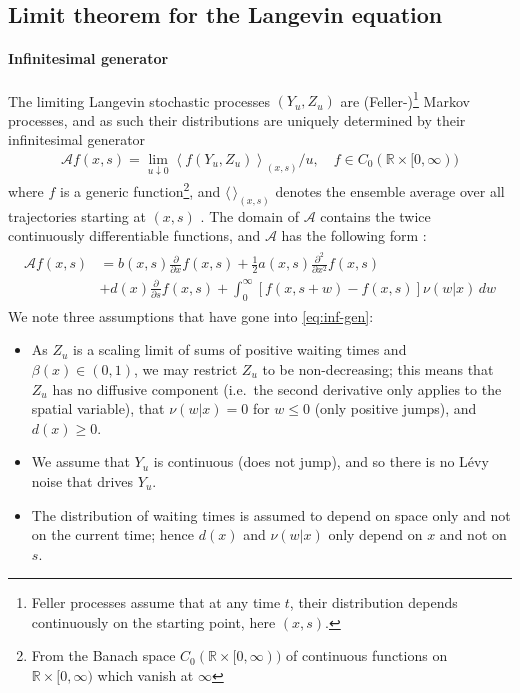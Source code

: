 \documentclass[a4paper,12pt]{elsarticle}
\numberwithin{equation}{section}
\theoremstyle{plain}
\theoremstyle{definition}
\theoremstyle{remark}
\numberwithin{equation}{section}
\newcommand{\spc}{\mathbb R}
\newcommand{\spctim}{\spc \times [0,\infty)}
\newcommand{\1}{\mathbf 1}
\newcommand{\del}{\partial}
\begin{document}
\subsection{Limit theorem for the Langevin equation}
\label{subsec:convergence}
\paragraph{Infinitesimal generator}
The limiting Langevin stochastic processes $(Y_u,Z_u)$ are (Feller-)\footnote{Feller processes assume that at any time $t$, their distribution depends continuously on the starting point, here $(x,s)$.} Markov
processes, and as such their distributions
are uniquely determined by their infinitesimal generator
\begin{align}
\mathcal A f(x,s) = \lim_{u \downarrow 0}
\left \langle f(Y_u, Z_u)\right \rangle_{(x,s)} / u, 
\quad f \in C_0(\spctim)
\end{align}
where $f$ is a generic function\footnote{From the Banach space
$C_0(\spctim)$ of continuous  functions on $\spctim$ which vanish at $\infty$},
and $\langle \, \rangle_{(x,s)}$ denotes the ensemble average over all
trajectories starting at $(x,s)$ \cite{Applebaum}. The domain of $\mathcal A$ contains the twice
continuously differentiable functions, and $\mathcal A$ has the following
form \cite[Section 6.7.1]{Applebaum}:
\begin{align} \label{eq:inf-gen}
\begin{split}
\mathcal A f(x,s)
&= b(x,s)\frac{\del }{\del x} f(x,s)
+\frac{1}{2} a(x,s) \frac{\del^2}{\del x^2} f(x,s)\\
&+ d(x) \frac{\partial}{\partial s} f(x,s)
+ \int_0^\infty \left[f(x,s+w)-f(x,s)
\right] \nu(w|x)\, dw
\end{split}
\end{align}
We note three assumptions that have gone into \eqref{eq:inf-gen}: 
\begin{itemize}
\item
As $Z_u$ is a scaling limit of sums of positive waiting times and 
$\beta(x) \in (0,1)$,
we may restrict $Z_u$ to be non-decreasing; this means that
$Z_u$ has no diffusive component (i.e.\ the second derivative only applies to 
the spatial variable), that $\nu(w|x) = 0$ for $w \le 0$
(only positive jumps), and $d(x) \ge 0$.
\item
We assume that $Y_u$ is continuous (does not jump),
and so there is no L\'evy noise that drives $Y_u$.
\item
The distribution of waiting times is assumed to depend on space only and not
on the current time; hence $d(x)$ and $\nu(w|x)$ only depend on $x$ and not on $s$.
\end{itemize}
\end{document}
